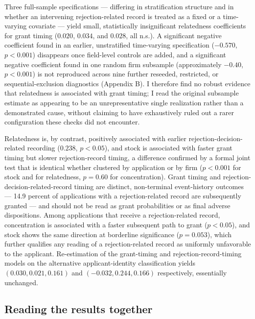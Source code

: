 \documentclass[12pt]{article}
\begin{document}
Three full-sample specifications --- differing in stratification structure and in whether an intervening rejection-related record is treated as a fixed or a time-varying covariate --- yield small, statistically insignificant relatedness coefficients for grant timing ($0.020$, $0.034$, and $0.028$, all n.s.). A significant negative coefficient found in an earlier, unstratified time-varying specification ($-0.570$, $p<0.001$) disappears once field-level controls are added, and a significant negative coefficient found in one random firm subsample (approximately $-0.40$, $p<0.001$) is not reproduced across nine further reseeded, restricted, or sequential-exclusion diagnostics (Appendix B). I therefore find no robust evidence that relatedness is associated with grant timing; I read the original subsample estimate as appearing to be an unrepresentative single realization rather than a demonstrated cause, without claiming to have exhaustively ruled out a rarer configuration these checks did not encounter.

Relatedness is, by contrast, positively associated with earlier rejection-decision-related recording ($0.238$, $p<0.05$), and stock is associated with faster grant timing but slower rejection-record timing, a difference confirmed by a formal joint test that is identical whether clustered by application or by firm ($p<0.001$ for stock and for relatedness, $p=0.60$ for concentration). Grant timing and rejection-decision-related-record timing are distinct, non-terminal event-history outcomes --- 14.9 percent of applications with a rejection-related record are subsequently granted --- and should not be read as grant probabilities or as final adverse dispositions. Among applications that receive a rejection-related record, concentration is associated with a faster subsequent path to grant ($p<0.05$), and stock shows the same direction at borderline significance ($p=0.053$), which further qualifies any reading of a rejection-related record as uniformly unfavorable to the applicant. Re-estimation of the grant-timing and rejection-record-timing models on the alternative applicant-identity classification yields $(0.030,0.021,0.161)$ and $(-0.032,0.244,0.166)$ respectively, essentially unchanged.

\subsection{Reading the results together}
\end{document}
